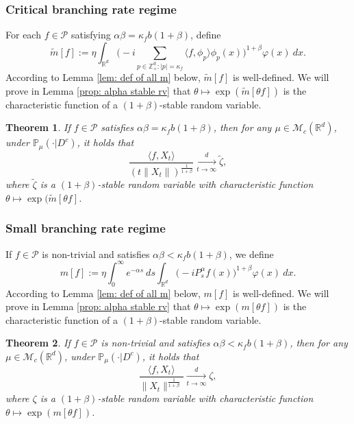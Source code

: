 \documentclass[12pt,a4paper]{amsart}
\theoremstyle{plain}
\newtheorem{thm}{Theorem}[section]
\theoremstyle{definition}
\numberwithin{equation}{section}
\begin{document}
\subsubsection{Critical branching rate regime}
For each $f\in \mathcal{P}$ satisfying $\alpha\beta=\kappa_f b(1+\beta)$, define
\begin{equation}
  \label{tilde-m}
  \widetilde{m}[f]
  := \eta\int_{\mathbb R^d} \Big(-i\sum_{p\in \mathbb Z_+^d:|p|=\kappa_f}\langle f,\phi_p\rangle\phi_p(x)\Big)^{1+\beta} \varphi(x)~dx.
\end{equation}
According to Lemma \ref{lem: def of all m} below, $\widetilde m[f]$ is well-defined.
We will prove in Lemma \ref{prop: alpha stable rv} that $\theta \mapsto \exp( \widetilde m[\theta f])$ is the characteristic function of a $(1+\beta)$-stable random variable.
\begin{thm}
  \label{thm: critical clt}
  If $f\in\mathcal{P}$ satisfies  $\alpha\beta=\kappa_fb(1+\beta)$, then for any $\mu\in \mathcal M_c(\mathbb R^d)$, under $\mathbb{P}_{\mu}(\cdot|D^c)$, it holds that
  \[
    \frac{\langle f,X_t\rangle}{\left(t\|X_t\|\right)^{\frac{1}{1+\beta}}}
    \xrightarrow[t\to \infty]{d} \widetilde{\zeta},
  \]
  where $\widetilde{\zeta}$ is a $(1+\beta)$-stable random variable with
  characteristic function
  $\theta\mapsto \exp(\widetilde{m}[\theta f]$.
\end{thm}

\subsubsection{Small branching rate regime}
\label{msmallcase}
If $f\in \mathcal{P}$ is non-trivial and satisfies  $\alpha\beta<\kappa_f b(1+\beta)$, we define
\begin{equation}
  m[f]
  := \eta \int_0^{\infty} e^{-\alpha s} ~ds\int_{\mathbb R^d} \big(-iP_s^\alpha f(x)\big)^{1+\beta} \varphi(x)~dx.
\end{equation}
According to Lemma \ref{lem: def of all m} below, $m[f]$ is well-defined.
We will prove  in Lemma \ref{prop: alpha stable rv} that $\theta \mapsto \exp( m[\theta f])$ is the characteristic function of a $(1+\beta)$-stable random variable.
\begin{thm}
  \label{thm: small clt}
  If $f\in\mathcal{P}$ is non-trivial and satisfies $\alpha\beta<\kappa_f b(1+\beta)$, then for any $\mu\in \mathcal M_c(\mathbb R^d)$, under $\mathbb{P}_{\mu}(\cdot|D^c)$, it holds that
  \[
    \frac{\langle f,X_t\rangle}{\|X_t\|^{\frac{1}{1+\beta}}}\xrightarrow[t\rightarrow \infty]{d} \zeta,
  \]
  where $\zeta$ is a $(1+\beta)$-stable random variable with
  characteristic function $\theta\mapsto \exp(m[\theta f])$.
\end{thm}
\end{document}
